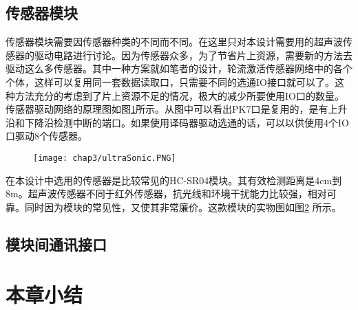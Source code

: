 \subsection{传感器模块}
传感器模块需要因传感器种类的不同而不同。在这里只对本设计需要用的超声波传感器的驱动电路进行讨论。因为传感器众多，为了节省片上资源，需要新的方法去驱动这么多传感器。其中一种方案就如笔者的设计，轮流激活传感器网络中的各个个体，这样可以复用同一套数据读取口，只需要不同的选通IO接口就可以了。这种方法充分的考虑到了片上资源不足的情况，极大的减少所要使用IO口的数量。传感器驱动网络的原理图如图\ref{fig.ultraSonic}所示。从图中可以看出PK7口是复用的，是有上升沿和下降沿检测中断的端口。如果使用译码器驱动选通的话，可以以供使用4个IO口驱动8个传感器。
\begin{figure}[!htp]\label{fig.ultraSonic}
  \centering
  \texttt{[image: chap3/ultraSonic.PNG]}
\end{figure}


在本设计中选用的传感器是比较常见的HC-SR04模块。其有效检测距离是4cm到8m。超声波传感器不同于红外传感器，抗光线和环境干扰能力比较强，相对可靠。同时因为模块的常见性，又使其非常廉价。这款模块的实物图如图\ref{fig.ultraSonicReal} 所示。 \\
\begin{figure}[!htp]\label{fig.ultraSonicReal}
  \centering
  \hspace{1in}
\end{figure}
\subsection{模块间通讯接口}
\section{本章小结}

